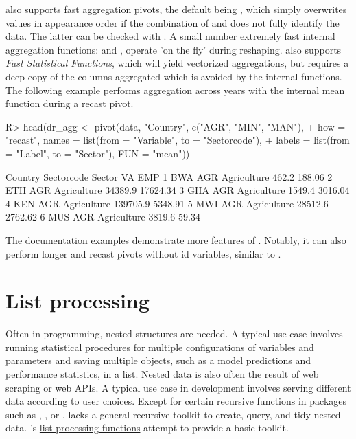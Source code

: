 \documentclass[article]{jss} %
\newcommand{\fct}[1]{\code{#1()}}
\begin{document}
\fct{pivot} also supports fast aggregation pivots, the default being , which simply overwrites values in appearance order if the combination of  and  does not fully identify the data. The latter can be checked with . A small number extremely fast internal aggregation functions:  and , operate 'on the fly' during reshaping. \fct{pivot} also supports \emph{Fast Statistical Functions}, which will yield vectorized aggregations, but requires a deep copy of the columns aggregated which is avoided by the internal functions. The following example performs aggregation across years with the internal mean function during a recast pivot.
\begin{Schunk}
\begin{Sinput}
R> head(dr_agg <- pivot(data, "Country", c("AGR", "MIN", "MAN"),
+    how = "recast", names = list(from = "Variable", to = "Sectorcode"),
+    labels = list(from = "Label", to = "Sector"), FUN = "mean"))
\end{Sinput}
\begin{Soutput}
  Country Sectorcode      Sector       VA      EMP
1     BWA        AGR Agriculture    462.2   188.06
2     ETH        AGR Agriculture  34389.9 17624.34
3     GHA        AGR Agriculture   1549.4  3016.04
4     KEN        AGR Agriculture 139705.9  5348.91
5     MWI        AGR Agriculture  28512.6  2762.62
6     MUS        AGR Agriculture   3819.6    59.34
\end{Soutput}
\end{Schunk}
The \href{https://sebkrantz.github.io/collapse/reference/pivot.html#ref-examples}{documentation examples} demonstrate more features of \fct{pivot}. Notably, it can also perform longer and recast pivots without id variables, similar to .
%
\section{List processing} \label{sec:list_proc}
%
Often in programming, nested structures are needed. A typical use case involves running statistical procedures for multiple configurations of variables and parameters and saving multiple objects, such as a model predictions and performance statistics, in a list. Nested data is also often the result of web scraping or web APIs. A typical use case in development involves serving different data according to user choices. Except for certain recursive functions in packages such as , , or ,  lacks a general recursive toolkit to create, query, and tidy nested data. 's \href{https://sebkrantz.github.io/collapse/reference/list-processing.html}{list processing functions} attempt to provide a basic toolkit. \newline
\end{document}
